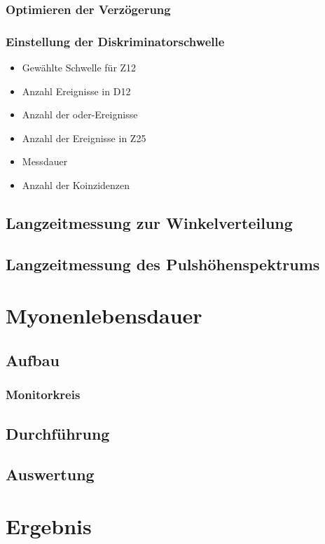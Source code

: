 \documentclass[11pt, ngerman, fleqn, DIV=15, headinclude, BCOR=2cm]{scrreprt}
\begin{document}
\subsection{Optimieren der Verzögerung}
\label{sec:optimieren_verzoegerung}

\subsection{Einstellung der Diskriminatorschwelle}
\label{sec:einstellung_diskriminatorschwelle}

\begin{itemize}
    \item
        Gewählte Schwelle für Z12

    \item
        Anzahl Ereignisse in D12

    \item
        Anzahl der oder-Ereignisse

    \item
        Anzahl der Ereignisse in Z25

    \item
        Messdauer

    \item
        Anzahl der Koinzidenzen
\end{itemize}


\section{Langzeitmessung zur Winkelverteilung}
\label{sec:langzeit_winkel}

\section{Langzeitmessung des Pulshöhenspektrums}
\label{sec:langzeit_puls}

\chapter{Myonenlebensdauer}

\section{Aufbau}

\subsection{Monitorkreis}

\section{Durchführung}

\section{Auswertung}

\chapter{Ergebnis}
\end{document}
